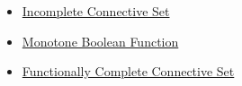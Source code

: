 \begin{dependencies}
\begin{itemize}
  \item \hyperref[def:incomplete-connective-set-propositional-logic]{Incomplete Connective Set}
  \item \hyperref[def:monotone-boolean-function-propositional-logic]{Monotone Boolean Function}
  \item \hyperref[def:functionally-complete-connective-set-propositional-logic]{Functionally Complete Connective Set}
\end{itemize}
\end{dependencies}
